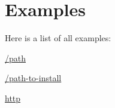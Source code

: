 \section{Examples}
Here is a list of all examples\-:\begin{DoxyCompactItemize}
\item 
\hyperlink{_2path-example}{/path}
\item 
\hyperlink{_2path-to-install-example}{/path-\/to-\/install}
\item 
\hyperlink{http-example}{http}
\end{DoxyCompactItemize}
